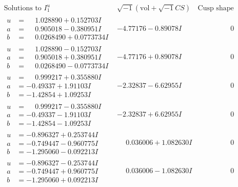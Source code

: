 \documentclass[1p]{elsarticle_modified}
\theoremstyle{definition}
\newcommand{\I}{\sqrt{-1}}
\begin{document}
$$\begin{array}{c|c|c}  
\text{Solutions to }I^u_{1}& \I (\text{vol} + \sqrt{-1}CS) & \text{Cusp shape}\\
 \hline 
\begin{aligned}
u &= \phantom{-}1.028890 + 0.152703 I \\
a &= \phantom{-}0.905018 - 0.380951 I \\
b &= \phantom{-}0.0268490 + 0.0773734 I\end{aligned}
 & -4.77176 - 0.89078 I & \phantom{-0.000000 } 0 \\ \hline\begin{aligned}
u &= \phantom{-}1.028890 - 0.152703 I \\
a &= \phantom{-}0.905018 + 0.380951 I \\
b &= \phantom{-}0.0268490 - 0.0773734 I\end{aligned}
 & -4.77176 + 0.89078 I & \phantom{-0.000000 } 0 \\ \hline\begin{aligned}
u &= \phantom{-}0.999217 + 0.355880 I \\
a &= -0.49337 + 1.91103 I \\
b &= -1.42854 + 1.09253 I\end{aligned}
 & -2.32837 - 6.62955 I & \phantom{-0.000000 } 0 \\ \hline\begin{aligned}
u &= \phantom{-}0.999217 - 0.355880 I \\
a &= -0.49337 - 1.91103 I \\
b &= -1.42854 - 1.09253 I\end{aligned}
 & -2.32837 + 6.62955 I & \phantom{-0.000000 } 0 \\ \hline\begin{aligned}
u &= -0.896327 + 0.253744 I \\
a &= -0.749447 - 0.960775 I \\
b &= -1.295060 - 0.092213 I\end{aligned}
 & \phantom{-}0.036006 + 1.082630 I & \phantom{-0.000000 } 0 \\ \hline\begin{aligned}
u &= -0.896327 - 0.253744 I \\
a &= -0.749447 + 0.960775 I \\
b &= -1.295060 + 0.092213 I\end{aligned}
 & \phantom{-}0.036006 - 1.082630 I & \phantom{-0.000000 } 0 \\ \hline\begin{aligned}

\end{aligned}
\end{array}$$
\end{document}
